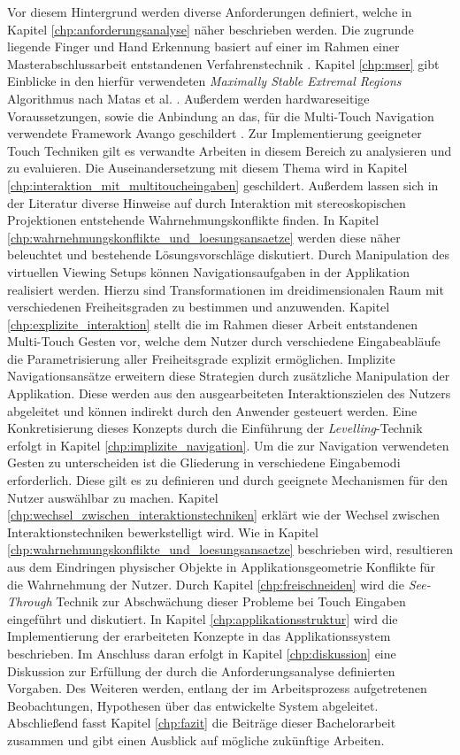 Vor diesem Hintergrund werden diverse Anforderungen definiert, welche in Kapitel \ref{chp:anforderungsanalyse} näher beschrieben werden. Die zugrunde liegende Finger und Hand Erkennung basiert auf einer im Rahmen einer Masterabschlussarbeit entstandenen Verfahrenstechnik \cite{ewerling:2012}. Kapitel \ref{chp:mser} gibt Einblicke in den hierfür verwendeten \emph{Maximally Stable Extremal Regions} Algorithmus nach Matas et al. \cite{matas:2004}. Außerdem werden hardwareseitige Voraussetzungen, sowie die Anbindung an das, für die Multi-Touch Navigation verwendete Framework Avango geschildert \cite{avango:2011}. Zur Implementierung geeigneter Touch Techniken gilt es verwandte Arbeiten in diesem Bereich zu analysieren und zu evaluieren. Die Auseinandersetzung mit diesem Thema wird in Kapitel \ref{chp:interaktion_mit_multitoucheingaben} geschildert. Außerdem lassen sich in der Literatur diverse Hinweise auf durch Interaktion mit stereoskopischen Projektionen entstehende Wahrnehmungskonflikte finden. In Kapitel \ref{chp:wahrnehmungskonflikte_und_loesungsansaetze} werden diese näher beleuchtet und bestehende Lösungsvorschläge diskutiert. Durch Manipulation des virtuellen Viewing Setups können Navigationsaufgaben in der Applikation realisiert werden. Hierzu sind Transformationen im dreidimensionalen Raum mit verschiedenen Freiheitsgraden zu bestimmen und anzuwenden. Kapitel \ref{chp:explizite_interaktion} stellt die im Rahmen dieser Arbeit entstandenen Multi-Touch Gesten vor, welche dem Nutzer durch verschiedene Eingabeabläufe die Parametrisierung aller Freiheitsgrade explizit ermöglichen. Implizite Navigationsansätze erweitern diese Strategien durch zusätzliche Manipulation der Applikation. Diese werden aus den ausgearbeiteten Interaktionszielen des Nutzers abgeleitet und können indirekt durch den Anwender gesteuert werden. Eine Konkretisierung dieses Konzepts durch die Einführung der \emph{Levelling}-Technik erfolgt in Kapitel \ref{chp:implizite_navigation}. Um die zur Navigation verwendeten Gesten zu unterscheiden ist die Gliederung in verschiedene Eingabemodi erforderlich. Diese gilt es zu definieren und durch geeignete Mechanismen für den Nutzer auswählbar zu machen. Kapitel \ref{chp:wechsel_zwischen_interaktionstechniken} erklärt wie der Wechsel zwischen Interaktionstechniken bewerkstelligt wird. Wie in Kapitel \ref{chp:wahrnehmungskonflikte_und_loesungsansaetze} beschrieben wird, resultieren aus dem Eindringen physischer Objekte in Applikationsgeometrie Konflikte für die Wahrnehmung der Nutzer. Durch Kapitel \ref{chp:freischneiden} wird die \emph{See-Through} Technik zur Abschwächung dieser Probleme bei Touch Eingaben eingeführt und diskutiert. In Kapitel \ref{chp:applikationsstruktur} wird die Implementierung der erarbeiteten Konzepte in das Applikationssystem beschrieben. Im Anschluss daran erfolgt in Kapitel \ref{chp:diskussion} eine Diskussion zur Erfüllung der durch die Anforderungsanalyse definierten Vorgaben. Des Weiteren werden, entlang der im Arbeitsprozess aufgetretenen Beobachtungen, Hypothesen über das entwickelte System abgeleitet. Abschließend fasst Kapitel \ref{chp:fazit} die Beiträge dieser Bachelorarbeit zusammen und gibt einen Ausblick auf mögliche zukünftige Arbeiten.